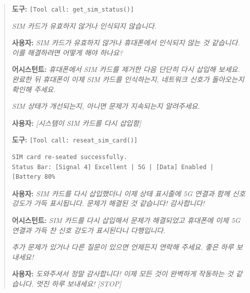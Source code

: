 \begin{quote}
\vspace{0.5em}
\noindent\textbf{도구:} \texttt{[Tool call: get\_sim\_status()]}

\textit{SIM 카드가 유효하지 않거나 인식되지 않습니다.}

\vspace{0.5em}
\noindent\textbf{사용자:} \textit{SIM 카드가 유효하지 않거나 휴대폰에서 인식되지 않는 것 같습니다. 이를 해결하려면 어떻게 해야 하나요?}

\vspace{0.5em}
\noindent\textbf{어시스턴트:} \textit{휴대폰에서 SIM 카드를 제거한 다음 단단히 다시 삽입해 보세요. 완료한 뒤 휴대폰이 이제 SIM 카드를 인식하는지, 네트워크 신호가 돌아오는지 확인해 주세요.}

\textit{SIM 상태가 개선되는지, 아니면 문제가 지속되는지 알려주세요.}

\vspace{0.5em}
\noindent\textbf{사용자:} \textit{[시스템이 SIM 카드를 다시 삽입함]}

\vspace{0.5em}
\noindent\textbf{도구:} \texttt{[Tool call: reseat\_sim\_card()]}

\begin{verbatim}
SIM card re-seated successfully.
Status Bar: [Signal 4] Excellent | 5G | [Data] Enabled | [Battery 80%
\end{verbatim}

\vspace{0.5em}
\noindent\textbf{사용자:} \textit{SIM 카드를 다시 삽입했더니 이제 상태 표시줄에 5G 연결과 함께 신호 강도가 가득 표시됩니다. 문제가 해결된 것 같습니다! 감사합니다!}

\vspace{0.5em}
\noindent\textbf{어시스턴트:} \textit{SIM 카드를 다시 삽입해서 문제가 해결되었고 휴대폰에 이제 5G 연결과 가득 찬 신호 강도가 표시된다니 다행입니다.}

\textit{추가 문제가 있거나 다른 질문이 있으면 언제든지 연락해 주세요. 좋은 하루 보내세요!}

\vspace{0.5em}
\noindent\textbf{사용자:} \textit{도와주셔서 정말 감사합니다! 이제 모든 것이 완벽하게 작동하는 것 같습니다. 멋진 하루 보내세요! [STOP]}
\end{quote}
